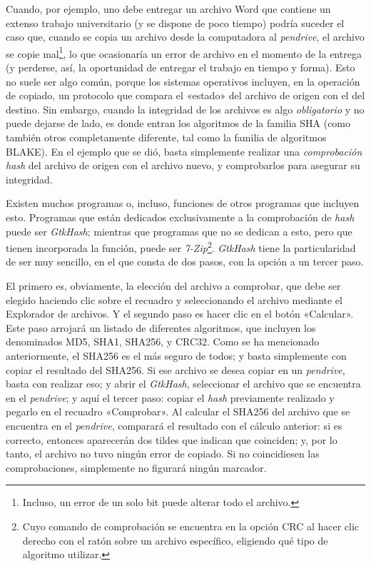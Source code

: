 \documentclass[12pt,a4paper,twoside]{book}
\begin{document}
Cuando, por ejemplo, uno debe entregar un archivo Word que contiene un extenso trabajo universitario (y se dispone de poco tiempo) podría suceder el caso que, cuando se copia un archivo desde la computadora al \textit{pendrive}, el archivo se copie mal\footnote{Incluso, un error de un solo bit puede alterar todo el archivo.}, lo que ocasionaría un error de archivo en el momento de la entrega (y perderse, así, la oportunidad de entregar el trabajo en tiempo y forma). Esto no suele ser algo común, porque los sistemas operativos incluyen, en la operación de copiado, un protocolo que compara el «estado» del archivo de origen con el del destino. Sin embargo, cuando la integridad de los archivos es algo \textit{obligatorio} y no puede dejarse de lado, es donde entran los algoritmos de la familia SHA (como también otros completamente diferente, tal como la familia de algoritmos BLAKE). En el ejemplo que se dió, basta simplemente realizar una \textit{comprobación hash} del archivo de origen con el archivo nuevo, y comprobarlos para asegurar su integridad.

Existen muchos programas o, incluso, funciones de otros programas que incluyen esto. Programas que están dedicados exclusivamente a la comprobación de \textit{hash} puede ser \textit{GtkHash}; mientras que programas que no se dedican a esto, pero que tienen incorporada la función, puede ser \textit{7-Zip}\footnote{Cuyo comando de comprobación se encuentra en la opción CRC al hacer clic derecho con el ratón sobre un archivo específico, eligiendo qué tipo de algoritmo utilizar.}. \textit{GtkHash} tiene la particularidad de ser muy sencillo, en el que consta de dos pasos, con la opción a un tercer paso.

El primero es, obviamente, la elección del archivo a comprobar, que debe ser elegido haciendo clic sobre el recuadro y seleccionando el archivo mediante el Explorador de archivos. Y el segundo paso es hacer clic en el botón «Calcular». Este paso arrojará un listado de diferentes algoritmos, que incluyen los denominados MD5, SHA1, SHA256, y CRC32. Como se ha mencionado anteriormente, el SHA256 es el más seguro de todos; y basta simplemente con copiar el resultado del SHA256. Si ese archivo se desea copiar en un \textit{pendrive}, basta con realizar eso; y abrir el \textit{GtkHash}, seleccionar el archivo que se encuentra en el \textit{pendrive}; y aquí el tercer paso: copiar el \textit{hash} previamente realizado y pegarlo en el recuadro «Comprobar». Al calcular el SHA256 del archivo que se encuentra en el \textit{pendrive}, comparará el resultado con el cálculo anterior: si es correcto, entonces aparecerán dos tildes que indican que coinciden; y, por lo tanto, el archivo no tuvo ningún error de copiado. Si no coincidiesen las comprobaciones, simplemente no figurará ningún marcador.
\end{document}
